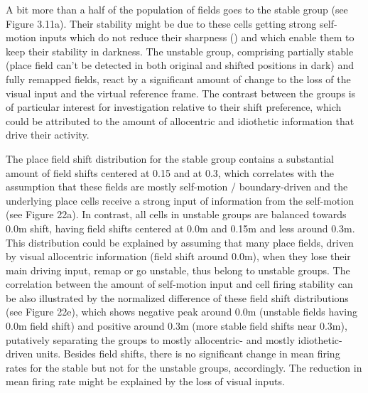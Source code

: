 A bit more than a half of the population of fields goes to the stable group (see Figure 3.11a). Their stability might be due to these cells getting strong self-motion inputs which do not reduce their sharpness (\cite{Allen2016}) and which enable them to keep their stability in darkness. The unstable group, comprising partially stable (place field can’t be detected in both original and shifted positions in dark) and fully remapped fields, react by a significant amount of change to the loss of the visual input and the virtual reference frame.  The contrast between the groups is of  particular interest for investigation relative to their shift preference, which could be attributed to the amount of allocentric and idiothetic information that drive their activity.

The place field shift distribution for the stable group contains a substantial amount of field shifts centered at 0.15 and at 0.3, which correlates with the assumption that these fields are mostly self-motion / boundary-driven and the underlying place cells receive a strong input of information from the self-motion (see Figure 22a). In contrast, all cells in unstable groups are balanced towards 0.0m shift, having field shifts centered at 0.0m and 0.15m and less around 0.3m. This distribution could be explained by assuming that many place fields, driven by visual allocentric information (field shift around 0.0m), when they lose their main driving input, remap or go unstable, thus belong to unstable groups. The correlation between the amount of self-motion input and cell firing stability can be also illustrated by the normalized difference of these field shift distributions (see Figure 22e), which shows negative peak around 0.0m (unstable fields having 0.0m field shift) and positive around 0.3m (more stable field shifts near 0.3m), putatively separating the groups to mostly allocentric- and mostly idiothetic- driven units. Besides field shifts, there is no significant change in mean firing rates for the stable but not for the unstable groups, accordingly. The reduction in mean firing rate might be explained by the loss of visual inputs.

